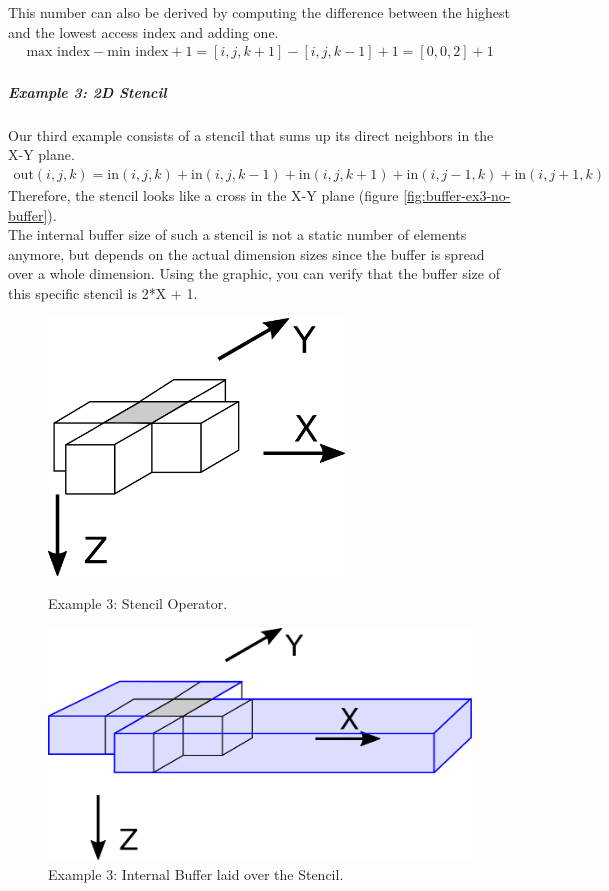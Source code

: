This number can also be derived by computing the difference between the highest and the lowest access index and adding one. 
\begin{align}
\text{max index} - \text{min index} + 1 = [i, j, k+1] - [i, j, k-1] + 1 = [0, 0, 2] + 1
\end{align}


\subparagraph{Example 3: 2D Stencil}
Our third example consists of a stencil that sums up its direct neighbors in the X-Y plane.
\begin{align}
\text{out}(i, j, k) = \text{in}(i, j, k) + \text{in}(i, j, k-1) + \text{in}(i, j, k+1) + \text{in}(i, j-1, k) + \text{in}(i, j+1, k)
\end{align}
Therefore, the stencil looks like a cross in the X-Y plane (figure \ref{fig:buffer-ex3-no-buffer}). \\
The internal buffer size of such a stencil is not a static number of elements anymore, but depends on the actual dimension sizes since the buffer is spread over a whole dimension. Using the graphic, you can verify that the buffer size of this specific stencil is 2*X + 1. 
\begin{figure}[h]
	\begin{minipage}{.5\columnwidth}
		\centering
		\includegraphics[width=0.7\textwidth]{drawings/buffer-ex3-no-buffer.png}
		\caption{Example 3: Stencil Operator.}
		\label{fig:buffer-ex3-no-buffer}
	\end{minipage}
	\begin{minipage}{.5\columnwidth}
		\centering
		\includegraphics[width=1.0\textwidth]{drawings/buffer-ex3-buffer.png}
		\caption{Example 3: Internal Buffer laid over the Stencil.}
		\label{fig:buffer-ex3-buffer}
	\end{minipage}
\end{figure}


